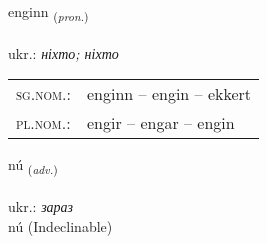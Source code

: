 \documentclass[frontgrid, backgrid]{flacards}\usepackage[]{graphicx}\usepackage[]{xcolor}
\begin{document}
\renewcommand{\flhead}{\vskip5pt \fboxsep=0pt {\small\bfseries\footnotesize Fornafn | займенник}}
\renewcommand{\fcfoot}{\vskip5pt \fboxsep=0pt \hspace{2pt}{\small\bfseries\footnotesize 1K}}

\renewcommand{\blhead}{\vskip5pt {\small\bfseries\footnotesize Fornafn | займенник }}
\renewcommand{\bcfoot}{\vskip5pt \hspace{2pt}{\small\bfseries\footnotesize 1K}}


{enginn \small{\textsubscript{(\textit{pron.})}} \\[1ex] %
\textphonetic{[eiɲcɪn]} \\
ukr.: \emph{ніхто; ніхто} \\  [2ex]
\renewcommand*{\arraystretch}{0.8}
\begin{tabular}{ll}
\textsc{sg.nom.}: & enginn  --  engin -- ekkert \\ 
\textsc{pl.nom.}: & engir -- engar -- engin
\end{tabular}
}


\renewcommand{\flhead}{\vskip5pt \fboxsep=0pt {\small\bfseries\footnotesize Atviksorð | прислівник}}
\renewcommand{\fcfoot}{\vskip5pt \fboxsep=0pt \hspace{2pt}{\small\bfseries\footnotesize 1K}}

\renewcommand{\blhead}{\vskip5pt {\small\bfseries\footnotesize Atviksorð | прислівник }}
\renewcommand{\bcfoot}{\vskip5pt \hspace{2pt}{\small\bfseries\footnotesize 1K}}


{nú \small{\textsubscript{(\textit{adv.})}} \\[1ex]
\textphonetic{[nuː]} \\
ukr.: \emph{зараз} \\  [2ex]
nú (Indeclinable)}

\renewcommand{\flhead}{\vskip5pt \fboxsep=0pt {\small\bfseries\footnotesize Sagnorð | дієслово}}
\renewcommand{\fcfoot}{\vskip5pt \fboxsep=0pt \hspace{2pt}{\small\bfseries\footnotesize 1K}}
\end{document}
